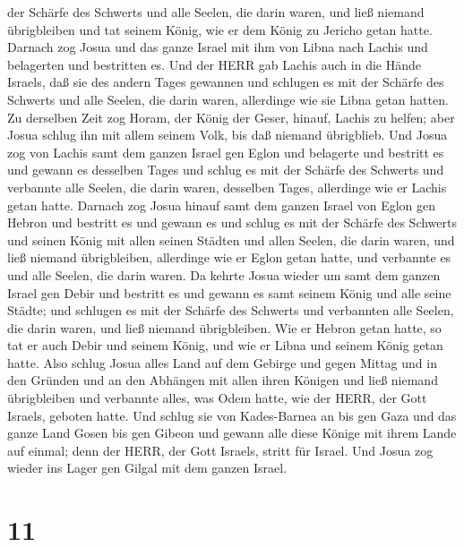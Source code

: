 der Schärfe des Schwerts und alle Seelen, die darin waren, und ließ
niemand übrigbleiben und tat seinem König, wie er dem König zu Jericho
getan hatte.  Darnach zog Josua und das ganze Israel mit
ihm von Libna nach Lachis und belagerten und bestritten es.
 Und der HERR gab Lachis auch in die Hände Israels, daß sie
des andern Tages gewannen und schlugen es mit der Schärfe des Schwerts
und alle Seelen, die darin waren, allerdinge wie sie Libna getan hatten.
 Zu derselben Zeit zog Horam, der König der Geser, hinauf,
Lachis zu helfen; aber Josua schlug ihn mit allem seinem Volk, bis daß
niemand übrigblieb.  Und Josua zog von Lachis samt dem
ganzen Israel gen Eglon und belagerte und bestritt es  und
gewann es desselben Tages und schlug es mit der Schärfe des Schwerts und
verbannte alle Seelen, die darin waren, desselben Tages, allerdinge wie
er Lachis getan hatte.  Darnach zog Josua hinauf samt dem
ganzen Israel von Eglon gen Hebron und bestritt es  und
gewann es und schlug es mit der Schärfe des Schwerts und seinen König
mit allen seinen Städten und allen Seelen, die darin waren, und ließ
niemand übrigbleiben, allerdinge wie er Eglon getan hatte, und verbannte
es und alle Seelen, die darin waren.  Da kehrte Josua
wieder um samt dem ganzen Israel gen Debir und bestritt es 
und gewann es samt seinem König und alle seine Städte; und schlugen es
mit der Schärfe des Schwerts und verbannten alle Seelen, die darin
waren, und ließ niemand übrigbleiben. Wie er Hebron getan hatte, so tat
er auch Debir und seinem König, und wie er Libna und seinem König getan
hatte.  Also schlug Josua alles Land auf dem Gebirge und
gegen Mittag und in den Gründen und an den Abhängen mit allen ihren
Königen und ließ niemand übrigbleiben und verbannte alles, was Odem
hatte, wie der HERR, der Gott Israels, geboten hatte.  Und
schlug sie von Kades-Barnea an bis gen Gaza und das ganze Land Gosen bis
gen Gibeon  und gewann alle diese Könige mit ihrem Lande
auf einmal; denn der HERR, der Gott Israels, stritt für Israel.
 Und Josua zog wieder ins Lager gen Gilgal mit dem ganzen
Israel.

\hypertarget{section-10}{%
\section{11}\label{section-10}}

